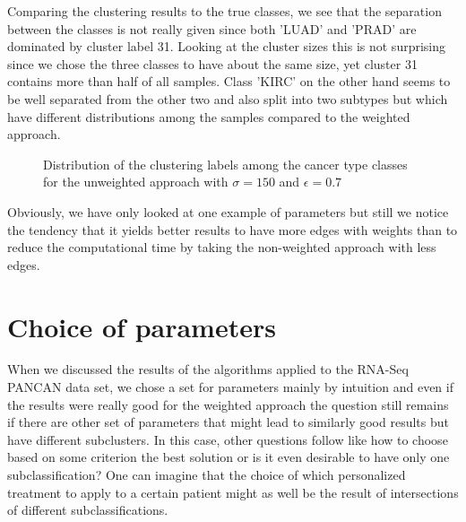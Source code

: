 \documentclass[paper=a4,fontsize=11pt,DIV=8,BCOR=5mm,twoside,pdftex,bibtotocnumbered]{scrreprt}
\theoremstyle{plain}
\begin{document}
Comparing the clustering results to the true classes, we see that the separation between the classes is not really given since both 'LUAD' and 'PRAD' are dominated by cluster label 31. Looking at the cluster sizes this is not surprising since we chose the three classes to have about the same size, yet cluster 31 contains more than half of all samples. Class 'KIRC' on the other hand seems to be well separated from the other two and also split into two subtypes but which have different distributions among the samples compared to the weighted approach. 

\begin{figure}
	\caption{Distribution of the clustering labels among the cancer type classes for the unweighted approach with $\sigma=150$ and  $\epsilon=0.7$}
	\centering
	\label{chart:distr_clustering_labels_unweighted}
\end{figure}

Obviously, we have only looked at one example of parameters but still we notice the tendency that it yields better results to have more edges with weights than to reduce the computational time by taking the non-weighted approach with less edges.

\section{Choice of parameters}\label{sec:choice_para}
When we discussed the results of the algorithms applied to the RNA-Seq PANCAN data set, we chose a set for parameters mainly by intuition and even if the results were really good for the weighted approach the question still remains if there are other set of parameters that might lead to similarly good results but have different subclusters. In this case, other questions follow like how to choose based on some criterion the best solution or is it even desirable to have only one subclassification? One can imagine that the choice of which personalized treatment to apply to a certain patient might as well be the result of intersections of different subclassifications. 
\end{document}
